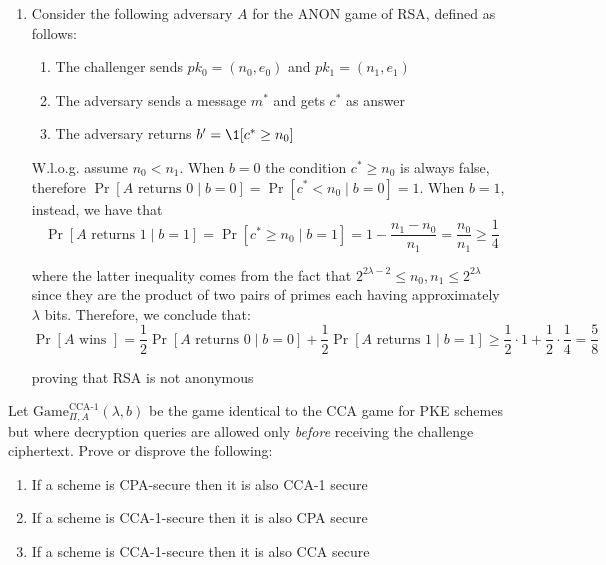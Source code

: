 \documentclass[a4paper, 12pt]{report}
\begin{document}
\begin{enumerate}
        When $Z = g^z$ with $z \in_R \Z_q$, the adversary $A^{\text{ANON}}_{\Pi}$ gets no additional information since the ciphertext is actually invalid. Therefore, we have that $\Pr[b' = b \mid Z = g^{z}] = \frac{1}{2}$, concluding that:
        \[\abs{\Pr[b' = b \mid Z = g^{xy}] - \Pr[b' = b \mid Z = g^z]} \geq \frac{1}{2} + \frac{1}{n^c}\]
        breaking the DDH assumption on $(\G, g, q)$.

        \item Consider the following adversary $A$ for the ANON game of RSA, defined as follows:
        \begin{enumerate}
            \item The challenger sends $pk_0 =(n_0, e_0)$ and $pk_1 = (n_1, e_1)$
            \item The adversary sends a message $m^*$ and gets $c^*$ as answer
            \item The adversary returns $b' = \1[c^* \geq n_0]$
        \end{enumerate}
        
        W.l.o.g. assume $n_0 < n_1$. When $b = 0$ the condition $c^* \geq n_0$ is always false, therefore $\Pr[A \text{ returns } 0 \mid b = 0] = \Pr[c^* < n_0 \mid b= 0 ] =  1$. When $b = 1$, instead, we have that
        $$\Pr[A \text{ returns } 1 \mid b = 1] = \Pr[c^* \geq n_0 \mid b= 1 ] =  1 - \frac{n_1 - n_0}{n_1} = \frac{n_0}{n_1} \geq  \frac{1}{4}$$

        where the latter inequality comes from the fact that $2^{2\lambda-2} \leq n_0, n_1 \leq 2^{2\lambda}$ since they are the product of two pairs of primes each having approximately $\lambda$ bits. Therefore, we conclude that:
        $$\Pr[A \text{ wins }] = \frac{1}{2} \Pr[A \text{ returns } 0 \mid b = 0] + \frac{1}{2} \Pr[A \text{ returns } 1 \mid b = 1]  \geq \frac{1}{2} \cdot 1 + \frac{1}{2} \cdot \frac{1}{4}= \frac{5}{8}$$

        proving that RSA is not anonymous
    \end{enumerate}

    \begin{framedprob}{}
        Let $\mathrm{Game}_{\Pi, A}^{\text{CCA-1}}(\lambda, b)$ be the game identical to the CCA game for PKE schemes but where decryption queries are allowed only \textit{before} receiving the challenge ciphertext. Prove or disprove the following:
        \begin{enumerate}
            \item If a scheme is CPA-secure then it is also CCA-1 secure
            \item If a scheme is CCA-1-secure then it is also CPA secure
            \item If a scheme is CCA-1-secure then it is also CCA secure
        \end{enumerate}
    \end{framedprob}
\end{document}
